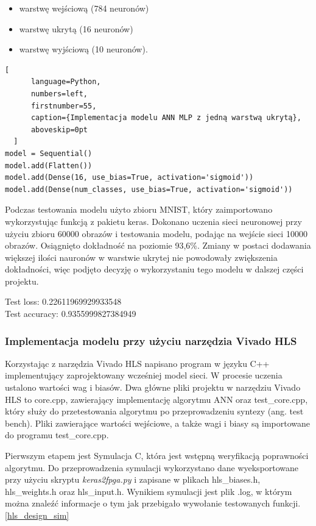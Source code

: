 \begin{itemize}
  \item warstwę wejściową (784 neuronów)
  \item warstwę ukrytą (16 neuronów)
  \item warstwę wyjściową (10 neuronów).
\end{itemize}

\begin{addmargin}[10mm]{0mm}
  \begin{lstlisting}[
      language=Python,
      numbers=left,
      firstnumber=55,
      caption={Implementacja modelu ANN MLP z jedną warstwą ukrytą},
      aboveskip=0pt
  ]
model = Sequential()
model.add(Flatten())
model.add(Dense(16, use_bias=True, activation='sigmoid'))
model.add(Dense(num_classes, use_bias=True, activation='sigmoid'))

  \end{lstlisting}
  \end{addmargin}

Podczas testowania modelu użyto zbioru MNIST, który zaimportowano wykorzystując
funkcją z pakietu keras. Dokonano uczenia sieci neuronowej przy użyciu zbioru 60000 
obrazów i testowania modelu, podając na wejście sieci 10000 obrazów. Osiągnięto 
dokładność na poziomie 93,6\%. 
Zmiany w postaci dodawania większej ilości nauronów w warstwie ukrytej nie powodowały 
zwiększenia dokładności, więc podjęto decyzję o wykorzystaniu tego modelu w dalszej 
części projektu.

Test loss: 0.22611969929933548\\
Test accuracy: 0.9355999827384949


\subsubsection{Implementacja modelu przy użyciu narzędzia Vivado HLS}

Korzystając z narzędzia Vivado HLS napisano program w języku C++ implementujący 
zaprojektowany wcześniej model sieci. W procesie uczenia ustalono wartości wag i 
biasów. Dwa główne pliki projektu w narzędziu Vivado HLS to core.cpp, zawierający 
implementację algorytmu ANN oraz test\_core.cpp, który służy do przetestowania
algorytmu po przeprowadzeniu syntezy (ang. test bench).   
Pliki zawierające wartości wejściowe, a także wagi i biasy są importowane 
do programu test\_core.cpp. 

Pierwszym etapem jest Symulacja C, która jest wstępną weryfikacją poprawności
algorytmu. Do przeprowadzenia symulacji wykorzystano dane wyeksportowane przy użyciu 
skryptu \emph{keras2fpga.py} i zapisane w plikach hls\_biases.h, hls\_weights.h oraz 
hls\_input.h. Wynikiem symulacji jest plik .log, w którym można znaleźć informacje o
tym jak przebigało wywołanie testowanych funkcji.\ref{hls_design_sim}

